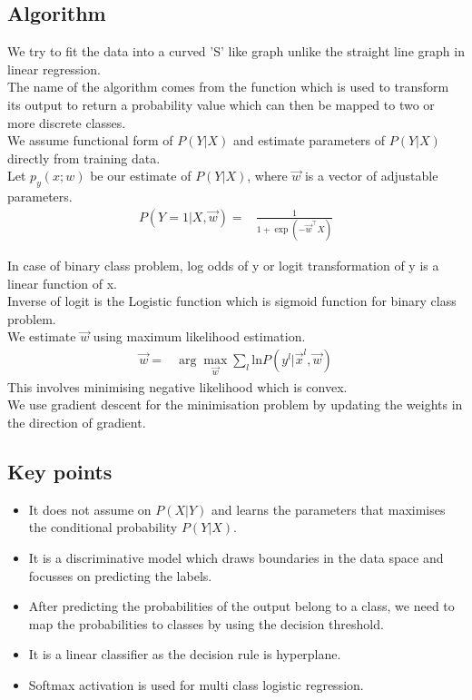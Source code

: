 \documentclass[12pt,letterpaper, onecolumn]{exam}
\begin{document}
\subsection*{Algorithm}
We try to fit the data into a curved 'S' like graph unlike the straight line graph in linear regression. \\
The name of the algorithm comes from the function which is used to transform its output to return a probability value which can then be mapped to two or more discrete classes. \\

We assume functional form of $P(Y|X)$ and estimate parameters of $P(Y|X)$ directly from training data.\\

Let $p_y(x;w)$ be our estimate of $P(Y|X)$, where $\vec{w}$ is a vector of adjustable parameters. \\

\begin{align}
P(Y=1|X,\vec{w}) = {}&\frac{1}{1+\exp{(-\vec{w}^\top X)}}
\end{align}

In case of binary class problem, log odds of y or logit transformation of y is a linear function of x.\\Inverse of logit is the Logistic function which is sigmoid function for binary class problem.\\ We estimate $\vec{w}$ using maximum likelihood estimation.
\begin{align}
\vec{w} = {}& \arg \max_{\vec{w}} \sum_{l} \text{ln} P(y^l|\vec{x}^l,\vec{w})
\end{align}
This involves minimising negative likelihood which is convex.\\
We use gradient descent for the minimisation problem by updating the weights in the direction of gradient.

\subsection*{Key points}
\begin{itemize}
\item It does not assume on $P(X|Y)$ and learns the parameters that maximises the conditional probability $P(Y|X)$.
\item It is a discriminative model which draws boundaries in the data space and focusses on predicting the labels.
\item After predicting the probabilities of the output belong to a class, we need to map the probabilities to classes by using the decision threshold.
\item It is a linear classifier as the decision rule is hyperplane.
\item Softmax activation is used for multi class logistic regression.
\end{itemize}
\end{document}
